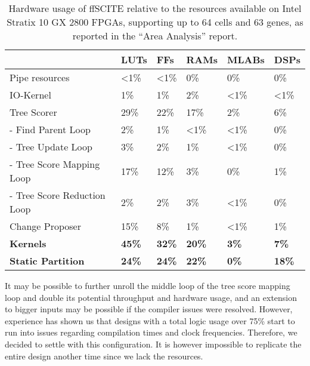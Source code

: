\begin{table}
    \centering
    \begin{tabular}{l|l|l|l|l|l}
        &                               \textbf{LUTs}&  \textbf{FFs} &  \textbf{RAMs} & \textbf{MLABs} &    \textbf{DSPs} \\
        \hline
        Pipe resources &                <1\% &          <1\% &          0\% &           0\% &               0\%	\\
        IO-Kernel &                     1\% &           1\% &           2\% &           <1\% &              <1\% \\
        Tree Scorer &                   29\% &          22\% &          17\% &          2\% &               6\% \\
        - Find Parent Loop &            2\% &           1\% &           <1\% &          <1\% &              0\% \\
        - Tree Update Loop &            3\% &           2\% &           1\% &           <1\% &              0\% \\
        - Tree Score Mapping Loop &     17\% &          12\% &          3\% &           0\% &               1\% \\
        - Tree Score Reduction Loop&    2\% &           2\% &           3\% &           <1\% &              0\% \\
        Change Proposer &               15\% &          8\% &           1\% &           <1\% &              1\% \\
        \hline
        \textbf{Kernels} &              \textbf{45\%} & \textbf{32\%} & \textbf{20\%} & \textbf{3\%} &      \textbf{7\%} \\
        \textbf{Static Partition} &     \textbf{24\%}&  \textbf{24\%} & \textbf{22\%} & \textbf{0\%} &      \textbf{18\%}	
    \end{tabular}
    \caption{Hardware usage of \ac{ffSCITE} relative to the resources available on Intel Stratix 10 GX 2800 \acp{FPGA}, supporting up to 64 cells and 63 genes, as reported in the ``Area Analysis'' report.}
    \label{tab:rel-usage}
\end{table}

It may be possible to further unroll the middle loop of the tree score mapping loop and double its potential throughput and hardware usage, and an extension to bigger inputs may be possible if the compiler issues were resolved. However, experience has shown us that designs with a total logic usage over 75\% start to run into issues regarding compilation times and clock frequencies. Therefore, we decided to settle with this configuration. It is however impossible to replicate the entire design another time since we lack the resources.
